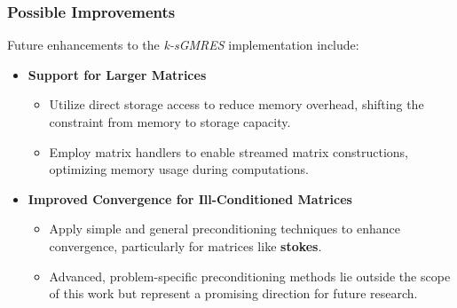\begin{frame}
    \frametitle{Possible Improvements}

    Future enhancements to the \textit{k-sGMRES} implementation include:

    \begin{itemize}
        \item \textbf{Support for Larger Matrices}
        \begin{itemize}
            \item Utilize direct storage access to reduce memory overhead, shifting the constraint from memory to storage capacity.
            \item Employ matrix handlers to enable streamed matrix constructions, optimizing memory usage during computations.
        \end{itemize}

        \item \textbf{Improved Convergence for Ill-Conditioned Matrices}
        \begin{itemize}
            \item Apply simple and general preconditioning techniques to enhance convergence, particularly for matrices like \textbf{stokes}.
            \item Advanced, problem-specific preconditioning methods lie outside the scope of this work but represent a promising direction for future research.
        \end{itemize}
    \end{itemize}

\end{frame}